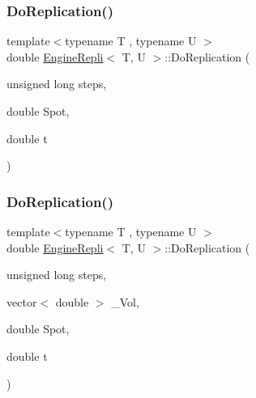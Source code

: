 \subsubsection{\texorpdfstring{Do\+Replication()}{DoReplication()}\hspace{0.1cm}{\footnotesize\ttfamily [1/2]}}
{\footnotesize\ttfamily template$<$typename T , typename U $>$ \\
double \hyperlink{classEngineRepli}{Engine\+Repli}$<$ T, U $>$\+::Do\+Replication (\begin{DoxyParamCaption}\item[{unsigned long}]{steps,  }\item[{double}]{Spot,  }\item[{double}]{t }\end{DoxyParamCaption})\hspace{0.3cm}{\ttfamily [inline]}}

\hypertarget{classEngineRepli_ad247f9177127cffcf82bc6603d7ad1db}{}\label{classEngineRepli_ad247f9177127cffcf82bc6603d7ad1db} 
\subsubsection{\texorpdfstring{Do\+Replication()}{DoReplication()}\hspace{0.1cm}{\footnotesize\ttfamily [2/2]}}
{\footnotesize\ttfamily template$<$typename T , typename U $>$ \\
double \hyperlink{classEngineRepli}{Engine\+Repli}$<$ T, U $>$\+::Do\+Replication (\begin{DoxyParamCaption}\item[{unsigned long}]{steps,  }\item[{vector$<$ double $>$}]{\+\_\+\+Vol,  }\item[{double}]{Spot,  }\item[{double}]{t }\end{DoxyParamCaption})\hspace{0.3cm}{\ttfamily [inline]}}

\hypertarget{classEngineRepli_a3eac0deeeb53bf5e034b0d643a8191c6}{}\label{classEngineRepli_a3eac0deeeb53bf5e034b0d643a8191c6} 
